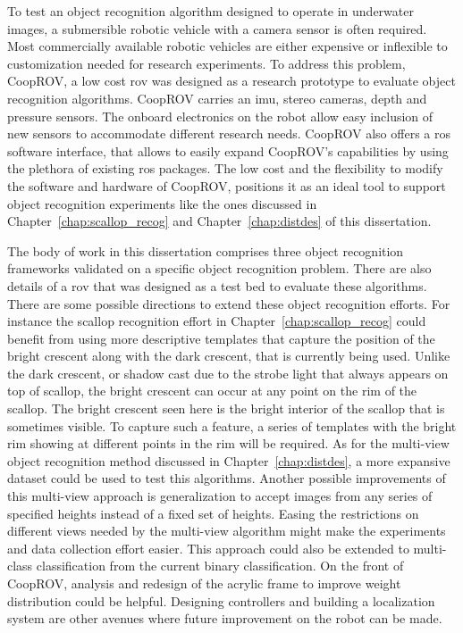 To test an object recognition algorithm designed to operate in underwater images, a submersible robotic vehicle with a camera sensor is often required.
Most commercially available robotic vehicles are either expensive or inflexible to customization needed for research experiments. To address this problem, CoopROV, a low cost \gls{rov} was designed as a research prototype to evaluate object recognition algorithms. CoopROV carries an \gls{imu}, stereo cameras, depth and pressure sensors. The onboard electronics on the robot allow easy inclusion of new sensors to accommodate different research needs. CoopROV also offers a \gls{ros} software interface, that allows to easily expand CoopROV's capabilities by using the plethora of existing \gls{ros} packages. The low cost and the flexibility to modify the software and hardware of CoopROV, positions it as an ideal tool to support object recognition experiments like the ones discussed in Chapter~\ref{chap:scallop_recog} and Chapter~\ref{chap:distdes} of this dissertation.

The body of work in this dissertation comprises three object recognition frameworks validated on a specific object recognition problem. There are also details of a \gls{rov} that was designed as a test bed to evaluate these algorithms. There are some possible directions to extend these object recognition efforts. For instance the scallop recognition effort in Chapter~\ref{chap:scallop_recog} could benefit from using more descriptive 
templates that capture the position of the bright crescent along with the dark
crescent, that is currently being used. Unlike the dark crescent, or shadow cast due to the strobe light that always appears on top of scallop, the bright crescent can occur at any point on the rim of the scallop. The bright crescent seen here is the bright interior of the scallop that is sometimes visible. To capture such a feature, a series of templates with the bright rim showing at different points in the rim will be required. As for the multi-view object recognition method discussed in Chapter~\ref{chap:distdes}, a more expansive dataset could be used to test this algorithms. Another possible improvements of this multi-view approach is generalization to accept images from any series of specified heights instead of a fixed set of heights. Easing the restrictions on different views needed by the multi-view algorithm might make the experiments and data collection effort easier. This approach could also be extended to multi-class classification from the current binary classification. On the front of CoopROV,
 analysis and redesign of the acrylic frame to improve 
weight distribution could be helpful. Designing controllers and building a localization system are other avenues where future improvement on the robot can be made.

